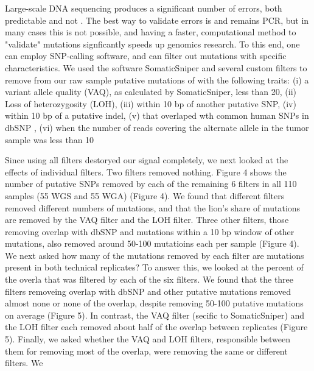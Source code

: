 \documentclass[11pt]{article} %
\begin{document}
Large-scale DNA sequencing produces a significant number of errors, both predictable and not \cite{sequence_error}. The best way to validate errors is and remains PCR, but in many cases this is not possible, and having a faster, computational method to "validate" mutations signficantly speeds up genomics research. To this end, one can employ SNP-calling software, and can filter out mutations with specific characteristics. We used the software SomaticSniper \cite{SomaticSniper} and several custom filters to remove from our raw sample putative mutations of with the following traits: (i) a variant allele quality (VAQ), as calculated by SomaticSniper, less than 20, (ii) Loss of heterozygosity (LOH), (iii) within 10 bp of another putative SNP, (iv) within 10 bp of a putative indel, (v) that overlaped wth common human SNPs in dbSNP \cite{dbSNP}, (vi) when the number of reads covering the alternate allele in the tumor sample was less than 10%

Since using all filters destoryed our signal completely, we next looked at the effects of individual filters. Two filters removed nothing. Figure 4 shows the number of putative SNPs removed by each of the remaining 6 filters in all 110 samples (55 WGS and 55 WGA) (Figure 4). We found that different filters removed different numbers of mutations, and that the lion's share of mutations are removed by the VAQ filter and the LOH filter. Three other filters, those removing overlap with dbSNP and mutations within a 10 bp window of other mutations, also removed around 50-100 mutatioins each per sample (Figure 4). We next asked how many of the mutations removed by each filter are mutations present in both technical replicates? To answer this, we looked at the percent of the overla that was filtered by each of the six filters. We found that the three filters removeing overlap with dbSNP and other putative mutations removed almost none or none of the overlap, despite removing 50-100 putative mutations on average (Figure 5). In contrast, the VAQ filter (secific to SomaticSniper) and the LOH filter each removed about half of the overlap between replicates (Figure 5). Finally, we asked whether the VAQ and LOH filters, responsible between them for removing most of the overlap, were removing the same or different filters. We 
\end{document}
